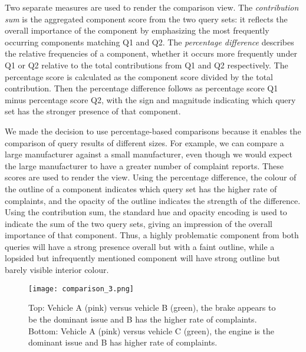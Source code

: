 Two separate measures are used to render the comparison view.
The \emph{contribution sum} is the aggregated component score from the two
query sets: it reflects the overall importance of the component by emphasizing
the most frequently occurring components matching Q1 and
Q2. The \emph{percentage difference} describes the relative frequencies of a
component, whether it occurs more frequently under Q1 or Q2 relative
to the total contributions from Q1 and Q2 respectively. The percentage
score is calculated as the component score divided by the total
contribution. Then the percentage difference follows as percentage
score Q1 minus percentage score Q2, with the sign and magnitude indicating
which query set has the stronger presence of that component.

We made the decision to use percentage-based comparisons because it
enables the comparison of query results of different sizes. For example, we can compare
a large manufacturer against a small manufacturer, even though we would expect the large 
manufacturer to have a greater number of complaint reports.
These scores are used to render the \threed view. Using the percentage
difference, the colour of the outline of a component indicates which
query set has the higher rate of complaints, and the opacity of the outline
indicates the strength of the difference. Using the contribution
sum, the standard hue and opacity encoding is used to indicate the
sum of the two query sets, giving an impression of the overall importance
of that component. Thus, a highly problematic component from
both queries will have a strong presence overall but with a faint outline,
while a lopsided but infrequently mentioned component will have
strong outline but barely visible interior colour.


	\begin{figure}
	 \centering  
	 \texttt{[image: comparison\_3.png]}
	 \caption[Comparison View.]{Top: Vehicle A (pink) versus vehicle B (green), the
	 brake appears to be the dominant issue and B has the higher rate of complaints. Bottom:
	 Vehicle A (pink) versus vehicle C (green), the engine is the dominant issue
	 and B has higher rate of complaints.}
	 \label{figure:comparison}
	\end{figure}
 

